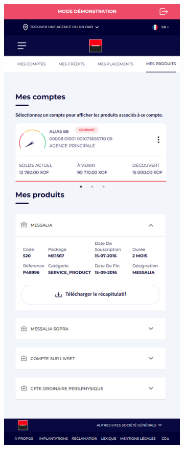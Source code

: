 \begin{figure}[!ht]
    \centering
    \begin{subfigure}[b]{0.49\textwidth}
        \centering
        \includegraphics[width=\textwidth]{images/screens/produits/mob.png}

\end{subfigure}
\end{figure}
